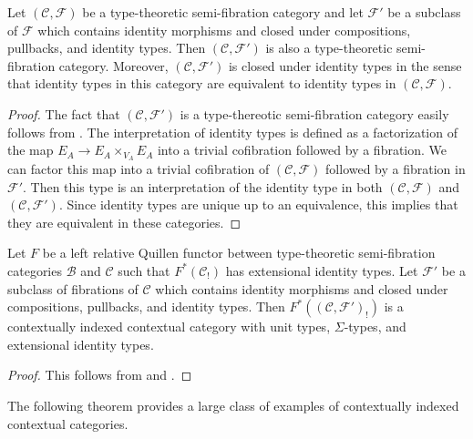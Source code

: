 \documentclass[reqno]{amsart}
\theoremstyle{definition}
\theoremstyle{remark}
\newcommand{\scat}[1]{\mathcal{#1}}
\newcommand{\Fib}{\mathcal{F}}
\numberwithin{figure}{section}
\begin{document}
\begin{prop}
Let $(\scat{C},\Fib)$ be a type-theoretic semi-fibration category and let $\Fib'$ be a subclass of $\Fib$ which contains identity morphisms and closed under compositions, pullbacks, and identity types.
Then $(\scat{C},\Fib')$ is also a type-theoretic semi-fibration category.
Moreover, $(\scat{C},\Fib')$ is closed under identity types in the sense that identity types in this category are equivalent to identity types in $(\scat{C},\Fib)$.
\end{prop}
\begin{proof}
The fact that $(\scat{C},\Fib')$ is a type-thereotic semi-fibration category easily follows from .
The interpretation of identity types is defined as a factorization of the map $E_A \to E_A \times_{V_A} E_A$ into a trivial cofibration followed by a fibration.
We can factor this map into a trivial cofibration of $(\scat{C},\Fib)$ followed by a fibration in $\Fib'$.
Then this type is an interpretation of the identity type in both $(\scat{C},\Fib)$ and $(\scat{C},\Fib')$.
Since identity types are unique up to an equivalence, this implies that they are equivalent in these categories.
\end{proof}

\begin{cor}
Let $F$ be a left relative Quillen functor between type-theoretic semi-fibration categories $\scat{B}$ and $\scat{C}$ such that $F^*(\scat{C}_!)$ has extensional identity types.
Let $\Fib'$ be a subclass of fibrations of $\scat{C}$ which contains identity morphisms and closed under compositions, pullbacks, and identity types.
Then $F^*((\scat{C},\Fib')_!)$ is a contextually indexed contextual category with unit types, $\Sigma$-types, and extensional identity types.
\end{cor}
\begin{proof}
This follows from  and .
\end{proof}

The following theorem provides a large class of examples of contextually indexed contextual categories.
\end{document}
